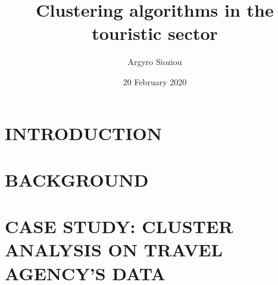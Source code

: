 \documentclass[onside]{book}
\title{Clustering algorithms in the touristic sector}
\author{Argyro Sioziou}
\date{20 February 2020}
\begin{document}




\tableofcontents

\chapter{INTRODUCTION}


\chapter{BACKGROUND}


\chapter{CASE STUDY: CLUSTER ANALYSIS ON TRAVEL AGENCY'S DATA}


 \printbibliography
\end{document}
